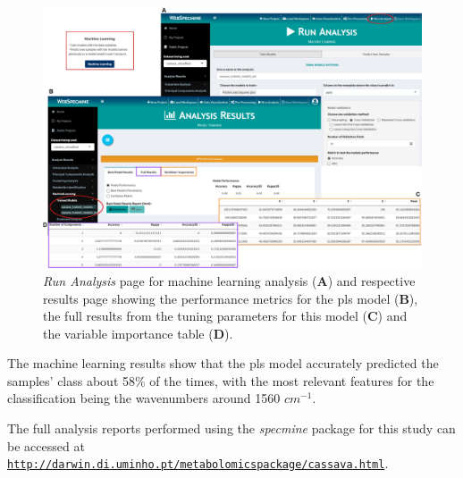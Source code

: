 \begin{figure}[H]
	\centering
	\includegraphics[width=1\linewidth]{Imagens/CassavaPPD/ml}
	\caption{\textit{Run Analysis} page for machine learning analysis (\textbf{A}) and respective results page showing the performance metrics for the \gls{pls} model (\textbf{B}), the full results from the tuning parameters for this model (\textbf{C}) and the variable importance table (\textbf{D}).}
	\label{cassava_machine_learning}
\end{figure}


The machine learning results show that the \gls{pls} model accurately predicted the samples' class about 58\% of the times, with the most relevant features for the classification being the wavenumbers around 1560 $cm^{-1}$.

The full analysis reports performed using the \textit{specmine} package for this study can be accessed at \href{http://darwin.di.uminho.pt/metabolomicspackage/cassava.html}{\nolinkurl{http://darwin.di.uminho.pt/metabolomicspackage/cassava.html}}.




